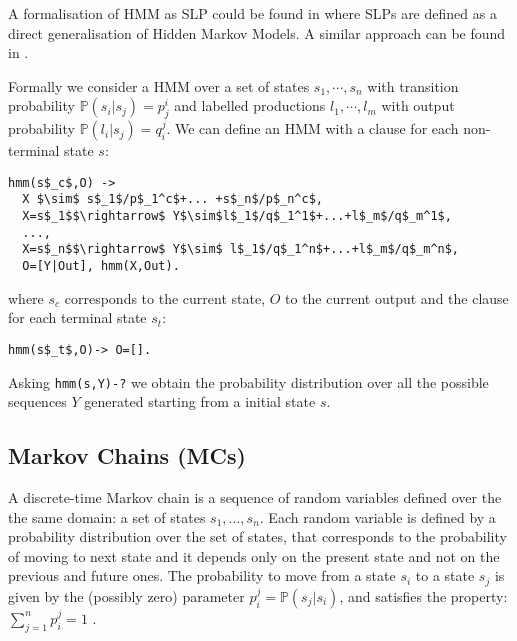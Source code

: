 \documentclass[letterpaper]{article}
\theoremstyle{plain}
\theoremstyle{definition}
\theoremstyle{remark}
\theoremstyle{definition}
\begin{document}
A formalisation of HMM as SLP could be found in \cite{SLPmuggleton96} where SLPs are defined as a direct generalisation of Hidden Markov Models. A similar approach can be found in \cite{SLPcussens2001}.

Formally we consider a HMM over a set of states $s_1, \cdots, s_n$ with transition probability $\mathbb{P}(s_i|s_j)=p_j^i$ and labelled productions $l_1, \cdots, l_m$ with output probability $\mathbb{P}(l_i|s_j)=q_i^j$. We can define an HMM with a clause for each non-terminal state $s$:
\begin{lstlisting}[mathescape=true]
hmm(s$_c$,O) ->
  X $\sim$ s$_1$/p$_1^c$+... +s$_n$/p$_n^c$, 
  X=s$_1$$\rightarrow$ Y$\sim$l$_1$/q$_1^1$+...+l$_m$/q$_m^1$,
  ...,
  X=s$_n$$\rightarrow$ Y$\sim$ l$_1$/q$_1^n$+...+l$_m$/q$_m^n$,
  O=[Y|Out], hmm(X,Out).
\end{lstlisting}
\noindent where $s_c$ corresponds to the current state, $O$ to the current output and the clause for each terminal state $s_t$:
\begin{lstlisting}[mathescape=true]
hmm(s$_t$,O)-> O=[].
\end{lstlisting}

Asking \lstinline[mathescape=true]{hmm(s,Y)-?} we obtain the probability distribution over all the possible sequences $Y$ generated starting from a initial state $s$.


\subsection{Markov Chains (MCs)}

A discrete-time Markov chain is a sequence of random variables defined over the the same domain: a set of states $s_1, \ldots, s_n$. Each random variable is defined by a probability distribution over the set of states, that corresponds to the probability of moving to next state and it depends only on the present state and not on the previous and future ones. The probability to move from a state $s_i$ to a state $s_j$ is given by the (possibly zero) parameter $p_i^j= \mathbb{P} (s_j |s_i)$, and satisfies the property: $\sum_{j=1}^n p_i^j =1$ .

\end{document}
